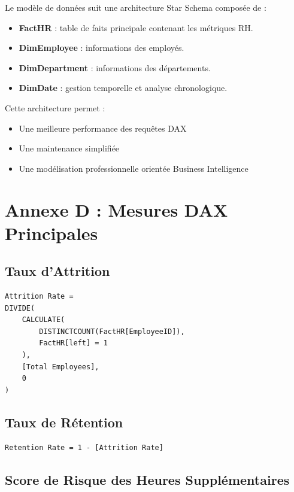 Le modèle de données suit une architecture Star Schema composée de :

\begin{itemize}
    \item \textbf{FactHR} : table de faits principale contenant les métriques RH.
    \item \textbf{DimEmployee} : informations des employés.
    \item \textbf{DimDepartment} : informations des départements.
    \item \textbf{DimDate} : gestion temporelle et analyse chronologique.
\end{itemize}

Cette architecture permet :
\begin{itemize}
    \item Une meilleure performance des requêtes DAX
    \item Une maintenance simplifiée
    \item Une modélisation professionnelle orientée Business Intelligence
\end{itemize}

\section*{Annexe D : Mesures DAX Principales}

\subsection*{Taux d'Attrition}

\begin{verbatim}
Attrition Rate =
DIVIDE(
    CALCULATE(
        DISTINCTCOUNT(FactHR[EmployeeID]),
        FactHR[left] = 1
    ),
    [Total Employees],
    0
)
\end{verbatim}

\subsection*{Taux de Rétention}

\begin{verbatim}
Retention Rate = 1 - [Attrition Rate]
\end{verbatim}

\subsection*{Score de Risque des Heures Supplémentaires}

